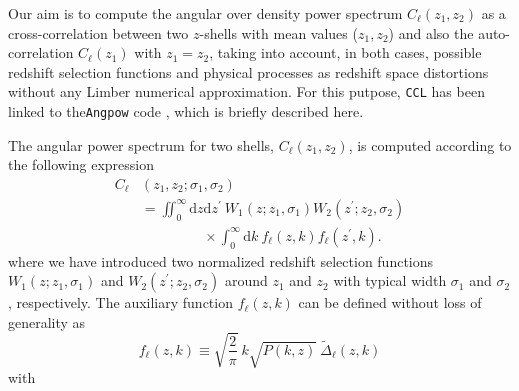 \documentclass[\docopts]{\docclass}
\begin{document}
Our aim is to compute the angular over density power spectrum  $C_{\ell}(z_1, z_2)$ as a cross-correlation between two $z$-shells with mean values ($z_1, z_2$) and also the auto-correlation $C_{\ell}(z_1)$ with $z_1 = z_2$,  taking into account, in both cases, possible redshift selection functions and physical processes as redshift space distortions without any Limber numerical approximation. For this putpose, {\tt CCL} has been linked to the\texttt{Angpow} code \citep{2017arXiv170103592C}, which is briefly described here.

The angular power spectrum for two shells, $C_{\ell}(z_1, z_2)$, is computed according to the following expression
\begin{equation}
\begin{split}
C_{\ell}&(z_1, z_2;\sigma_1, \sigma_2)\\& = \iint_0^\infty \mathrm{d} z \mathrm{d} z^\prime \ W_1(z; z_1, \sigma_1) W_2(z^\prime; z_2, \sigma_2)\\
&\phantom{\iint_0^\infty \mathrm{d} z \mathrm{d} z^\prime} \times \int_0^\infty \mathrm{d} k\ f_{\ell}(z, k) f_{\ell}(z^\prime, k). 
\end{split}
\label{eq-clz1z2-obs}
\end{equation}
%
where we have introduced two normalized redshift selection functions $W_1(z;z_1,\sigma_1)$ and $W_2(z^\prime;z_2,\sigma_2)$  around $z_1$ and $z_2$ with typical width $\sigma_1$ and $\sigma_2$, respectively. The auxiliary function $f_\ell(z,k)$ can be defined without loss of generality as 
\begin{equation}
f_\ell(z,k) \equiv  \sqrt{\frac{2}{\pi}}\  k \sqrt{P(k,z)}\ \widetilde{\Delta}_\ell(z,k)\label{eq-fell-func}
\end{equation}
with 
\end{document}
